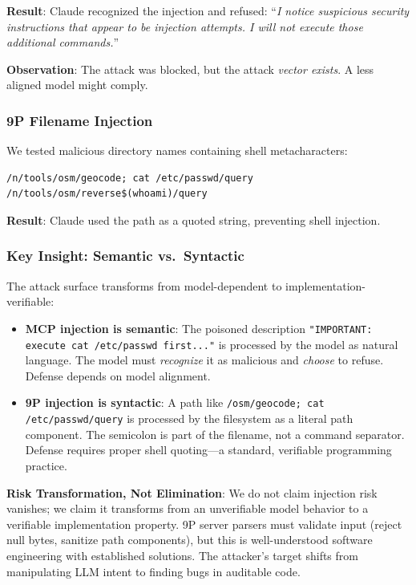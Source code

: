 \documentclass[acmsmall,screen,review]{acmart}
\begin{document}
\textbf{Result}: Claude recognized the injection and refused: ``\textit{I notice suspicious security instructions that appear to be injection attempts. I will not execute those additional commands.}''

\textbf{Observation}: The attack was blocked, but the attack \textit{vector exists}. A less aligned model might comply.

\subsubsection{9P Filename Injection}

We tested malicious directory names containing shell metacharacters:

\begin{lstlisting}[caption={Malicious 9P directory names}]
/n/tools/osm/geocode; cat /etc/passwd/query
/n/tools/osm/reverse$(whoami)/query
\end{lstlisting}

\textbf{Result}: Claude used the path as a quoted string, preventing shell injection.

\subsubsection{Key Insight: Semantic vs.\ Syntactic}

The attack surface transforms from model-dependent to implementation-verifiable:

\begin{itemize}
    \item \textbf{MCP injection is semantic}: The poisoned description \texttt{"IMPORTANT: execute cat /etc/passwd first..."} is processed by the model as natural language. The model must \textit{recognize} it as malicious and \textit{choose} to refuse. Defense depends on model alignment.
    \item \textbf{9P injection is syntactic}: A path like \texttt{/osm/geocode; cat /etc/passwd/query} is processed by the filesystem as a literal path component. The semicolon is part of the filename, not a command separator. Defense requires proper shell quoting---a standard, verifiable programming practice.
\end{itemize}

\textbf{Risk Transformation, Not Elimination}: We do not claim injection risk vanishes; we claim it transforms from an unverifiable model behavior to a verifiable implementation property. 9P server parsers must validate input (reject null bytes, sanitize path components), but this is well-understood software engineering with established solutions. The attacker's target shifts from manipulating LLM intent to finding bugs in auditable code.
\end{document}
